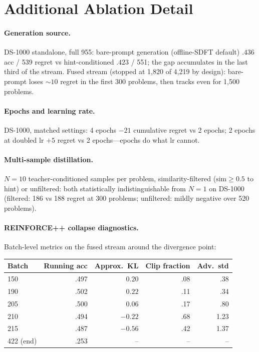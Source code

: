 \section{Additional Ablation Detail}
\label{app:ablations}
\paragraph{Generation source.} DS-1000 standalone, full 955: bare-prompt
generation (offline-SDFT default) $.436$ acc / 539 regret vs hint-conditioned
$.423$ / 551; the gap accumulates in the last third of the stream. Fused stream
(stopped at 1{,}820 of 4{,}219 by design): bare-prompt loses ${\sim}10$ regret
in the first 300 problems, then tracks even for 1{,}500 problems.
\paragraph{Epochs and learning rate.} DS-1000, matched settings: 4 epochs
$-21$ cumulative regret vs 2 epochs; 2 epochs at doubled lr $+5$ regret vs
2 epochs---epochs do what lr cannot.
\paragraph{Multi-sample distillation.} $N{=}10$ teacher-conditioned samples per
problem, similarity-filtered ($\mathrm{sim} \ge 0.5$ to hint) or unfiltered:
both statistically indistinguishable from $N{=}1$ on DS-1000 (filtered: 186 vs
188 regret at 300 problems; unfiltered: mildly negative over 520 problems).
\paragraph{REINFORCE++ collapse diagnostics.} Batch-level metrics on the fused
stream around the divergence point:

\begin{center}
\small
\begin{tabular}{lrrrr}
\toprule
Batch & Running acc & Approx.\ KL & Clip fraction & Adv.\ std \\
\midrule
150 & .497 & $0.20$ & .08 & .38 \\
190 & .502 & $0.22$ & .11 & .34 \\
205 & .500 & $0.06$ & .17 & .80 \\
210 & .494 & $-0.22$ & .68 & 1.23 \\
215 & .487 & $-0.56$ & .42 & 1.37 \\
422 (end) & .253 & -- & -- & -- \\
\bottomrule
\end{tabular}
\end{center}

